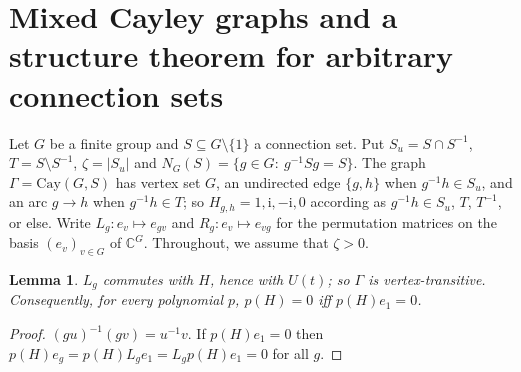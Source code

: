 \documentclass[preprint,11pt]{elsarticle}
\newtheorem{lemma}[theorem]{Lemma}
\theoremstyle{definition}
\theoremstyle{remark}
\newcommand{\ii}{\mathrm i}
\begin{document}
\section{Mixed Cayley graphs and a structure theorem for arbitrary connection sets}\label{sec:G}

Let $G$ be a finite group and $S\subseteq G\setminus\{1\}$ a connection set. Put $S_u=S\cap S^{-1}$, $T=S\setminus S^{-1}$, $\zeta=|S_u|$ and $N_G(S)=\{g\in G:\ g^{-1}Sg=S\}$. The graph $\Gamma=\mathrm{Cay}(G,S)$ has vertex set $G$, an undirected edge $\{g,h\}$ when $g^{-1}h\in S_u$, and an arc $g\to h$ when $g^{-1}h\in T$; so $H_{g,h}=1,\ii,-\ii,0$ according as $g^{-1}h\in S_u$, $T$, $T^{-1}$, or else. Write $L_g:e_v\mapsto e_{gv}$ and $R_g:e_v\mapsto e_{vg}$ for the permutation matrices on the basis $(e_v)_{v\in G}$ of $\mathbb C^G$. Throughout, we assume that $\zeta>0$.
\begin{lemma}\label{lem:symL}
$L_g$ commutes with $H$, hence with $U(t)$; so $\Gamma$ is vertex-transitive. Consequently, for every polynomial $p$, $p(H)=0$ iff $p(H)e_1=0$.
\end{lemma}
\begin{proof}
$(gu)^{-1}(gv)=u^{-1}v$. If $p(H)e_1=0$ then $p(H)e_g=p(H)L_ge_1=L_gp(H)e_1=0$ for all $g$.
\end{proof}
\end{document}

